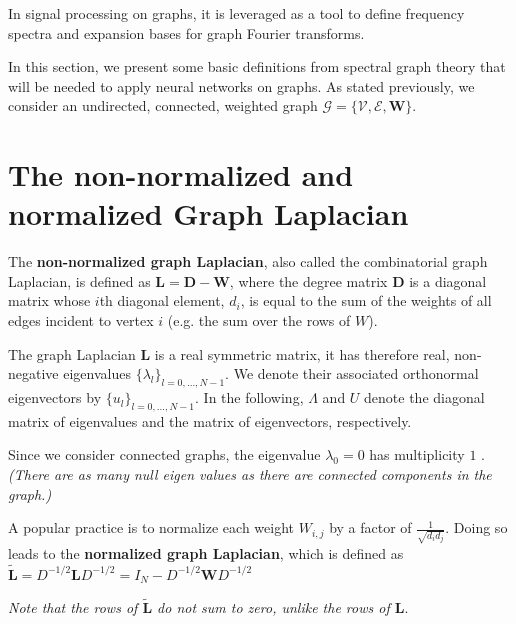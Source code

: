 \documentclass[sigconf]{acmart}
\begin{document}
In signal processing on graphs, it is leveraged as a tool to define frequency spectra and expansion bases for graph Fourier transforms.

In this section, we present some basic definitions from spectral graph theory that will be needed to apply neural networks on graphs. As stated previously, we consider an undirected, connected, weighted graph $\mathcal{G} = \{\mathcal{V}, \mathcal{E}, \mathbf{W}\}$. 

\section{The non-normalized and normalized Graph Laplacian}
The \textbf{non-normalized graph Laplacian}, also called the combinatorial graph Laplacian, is defined 
as $\mathbf{L} = \mathbf{D}-\mathbf{W}$, where the degree matrix $\mathbf{D}$ 
is a diagonal matrix 
whose $i$th diagonal element, $d_i$, is equal to the sum of the weights of all edges incident to vertex $i$
(e.g. the sum over the rows of ${W}$).

The graph Laplacian $\mathbf{L}$ is a real symmetric matrix, it has therefore real, non-negative eigenvalues $\{\lambda_l\}_{l=0, \dots, N-1}$. 
We denote their associated  orthonormal eigenvectors by $\{u_l\}_{l=0,\dots, N-1}$. In the following, $\Lambda$ and $U$ denote the diagonal matrix of eigenvalues and the matrix of eigenvectors, respectively.

Since we consider connected graphs, the eigenvalue $\lambda_0=0$ has multiplicity $1$  \cite{shuman_emerging_2013}. 
\textit{(There are as many null eigen values as there are connected components in the graph.)}

A popular practice is to normalize each weight $W_{i, j}$ by a factor of $\frac{1}{\sqrt{d_id_j}}$.
Doing so leads to the \textbf{normalized graph Laplacian}, which is defined as $\tilde{\mathbf{L}} = D^{-1/2}\mathbf{L}D^{-1/2} = I_N - D^{-1/2}\mathbf{W}D^{-1/2}$

\textit{Note that the rows of  $\tilde{\mathbf{L}}$ do not sum to zero, unlike the rows of $\mathbf{L}$}.
\end{document}
